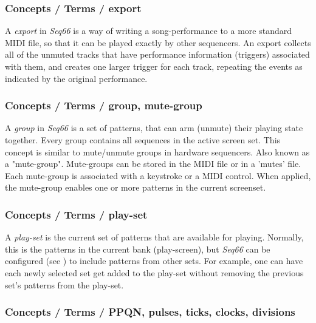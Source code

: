 \subsubsection{Concepts / Terms / export}
\label{subsubsec:concepts_terms_export}

   A \textsl{export} in \textsl{Seq66} is a way of writing a
   song-performance to a more standard MIDI file, so that it can be played
   exactly by other sequencers.
   An export collects all of the unmuted tracks that have
   performance information (triggers) associated with them, and creates one
   larger trigger for each track, repeating the events as indicated by the
   original performance.

\subsubsection{Concepts / Terms / group, mute-group}
\label{subsubsec:concepts_terms_group}

   A \textsl{group} in \textsl{Seq66} is a
   set of patterns, that can arm (unmute) their playing state
   together.
   Every group contains all sequences in the active screen set. 
   This concept is similar to mute/unmute groups in hardware
   sequencers.
   Also known as a "mute-group".
   Mute-groups can be stored in the MIDI file or in a 'mutes' file.
   Each mute-group is associated with a keystroke or a MIDI control.
   When applied, the mute-group enables one or more patterns in the current
   screenset.

\subsubsection{Concepts / Terms / play-set}
\label{subsubsec:concepts_terms_playset}

   A \textsl{play-set} is the current set of patterns that are available for
   playing.  Normally, this is the patterns in the current bank (play-screen),
   but \textsl{Seq66} can be configured
   (see )
   to include patterns from other sets.
   For example, one can have each newly selected set get added to the play-set
   without removing the previous set's patterns from the play-set.

\subsubsection{Concepts / Terms / PPQN, pulses, ticks, clocks, divisions}
\label{subsubsec:concepts_terms_pulses}

